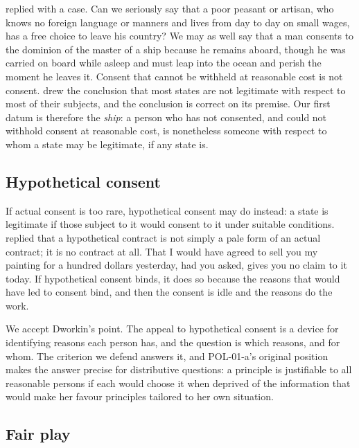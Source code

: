 \documentclass{situationist-preprint}
\begin{document}
\citet{Hume1748} replied with a case. Can we seriously say that a poor peasant or artisan, who knows no foreign language or manners and lives from day to day on small wages, has a free choice to leave his country? We may as well say that a man consents to the dominion of the master of a ship because he remains aboard, though he was carried on board while asleep and must leap into the ocean and perish the moment he leaves it. Consent that cannot be withheld at reasonable cost is not consent. \citet{Simmons1979} drew the conclusion that most states are not legitimate with respect to most of their subjects, and the conclusion is correct on its premise. Our first datum is therefore the \emph{ship}: a person who has not consented, and could not withhold consent at reasonable cost, is nonetheless someone with respect to whom a state may be legitimate, if any state is.

\subsection{Hypothetical consent}

If actual consent is too rare, hypothetical consent may do instead: a state is legitimate if those subject to it would consent to it under suitable conditions. \citet{Dworkin1973} replied that a hypothetical contract is not simply a pale form of an actual contract; it is no contract at all. That I would have agreed to sell you my painting for a hundred dollars yesterday, had you asked, gives you no claim to it today. If hypothetical consent binds, it does so because the reasons that would have led to consent bind, and then the consent is idle and the reasons do the work.

We accept Dworkin's point. The appeal to hypothetical consent is a device for identifying reasons each person has, and the question is which reasons, and for whom. The criterion we defend answers it, and POL-01-a's original position makes the answer precise for distributive questions: a principle is justifiable to all reasonable persons if each would choose it when deprived of the information that would make her favour principles tailored to her own situation.

\subsection{Fair play}
\end{document}

